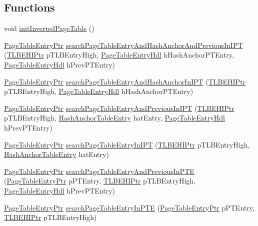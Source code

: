 \subsection*{Functions}
\begin{CompactItemize}
\item 
void \hyperlink{group___v_m_m___i_p_t_g633bd0e0b24708177aebf72079714748}{initInvertedPageTable} ()
\item 
\hyperlink{struct_page_table_entry}{PageTableEntryPtr} \hyperlink{group___v_m_m___i_p_t_g4495d1e87487776b13d7c0f8c8c75ec9}{searchPageTableEntryAndHashAnchorAndPreviousInIPT} (\hyperlink{struct_t_l_b_e_h_i}{TLBEHIPtr} pTLBEntryHigh, \hyperlink{struct_page_table_entry}{PageTableEntryHdl} hHashAnchorPTEntry, \hyperlink{struct_page_table_entry}{PageTableEntryHdl} hPrevPTEntry)
\item 
\hyperlink{struct_page_table_entry}{PageTableEntryPtr} \hyperlink{group___v_m_m___i_p_t_g1ce348812f454f6c840bbbbcbad37add}{searchPageTableEntryAndHashAnchorInIPT} (\hyperlink{struct_t_l_b_e_h_i}{TLBEHIPtr} pTLBEntryHigh, \hyperlink{struct_page_table_entry}{PageTableEntryHdl} hHashAnchorPTEntry)
\item 
\hyperlink{struct_page_table_entry}{PageTableEntryPtr} \hyperlink{group___v_m_m___i_p_t_g6a86fa230ac72f34daf47257381eb181}{searchPageTableEntryAndPreviousInIPT} (\hyperlink{struct_t_l_b_e_h_i}{TLBEHIPtr} pTLBEntryHigh, \hyperlink{group___v_m_m___h_a_t_g06b98a0b294446afee1b27a04682d7c2}{HashAnchorTableEntry} hatEntry, \hyperlink{struct_page_table_entry}{PageTableEntryHdl} hPrevPTEntry)
\item 
\hyperlink{struct_page_table_entry}{PageTableEntryPtr} \hyperlink{group___v_m_m___i_p_t_g150394a17b25cd9912983172c7b3803a}{searchPageTableEntryInIPT} (\hyperlink{struct_t_l_b_e_h_i}{TLBEHIPtr} pTLBEntryHigh, \hyperlink{group___v_m_m___h_a_t_g06b98a0b294446afee1b27a04682d7c2}{HashAnchorTableEntry} hatEntry)
\item 
\hyperlink{struct_page_table_entry}{PageTableEntryPtr} \hyperlink{group___v_m_m___i_p_t_gceafcd302dd2b1aca0074e443f53d093}{searchPageTableEntryAndPreviousInPTE} (\hyperlink{struct_page_table_entry}{PageTableEntryPtr} pPTEntry, \hyperlink{struct_t_l_b_e_h_i}{TLBEHIPtr} pTLBEntryHigh, \hyperlink{struct_page_table_entry}{PageTableEntryHdl} hPrevPTEntry)
\item 
\hyperlink{struct_page_table_entry}{PageTableEntryPtr} \hyperlink{group___v_m_m___i_p_t_g87ad4a7444ff78fa4502299524d8a5b9}{searchPageTableEntryInPTE} (\hyperlink{struct_page_table_entry}{PageTableEntryPtr} pPTEntry, \hyperlink{struct_t_l_b_e_h_i}{TLBEHIPtr} pTLBEntryHigh)

\end{CompactItemize}
